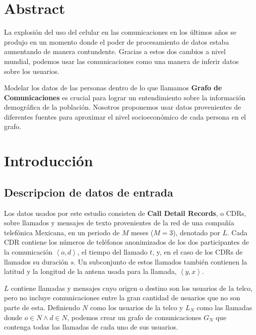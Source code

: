 \documentclass{article}
\begin{document}
\section{Abstract}

La explosi\'on del uso del celular en las comunicaciones en los \'ultimos a\~nos se produjo en un momento donde el poder de procesamiento de datos estaba aumentando de manera contundente. Gracias a estos dos cambios a nivel mundial, podemos usar las comunicaciones como una manera de inferir datos sobre los usuarios.

Modelar los datos de las personas dentro de lo que llamamos \textbf{Grafo de Comunicaciones} es crucial para lograr un entendimiento sobre la informaci\'on demogr\'afica de la poblaci\'on. Nosotros proponemos usar datos provenientes de diferentes fuentes para aproximar el nivel socioecon\'omico de cada persona en el grafo.

\section{Introducci\'on}


\subsection{Descripcion de datos de entrada}

Los datos usados por este estudio consisten de \textbf{Call Detail Records}, o CDRs, sobre llamados y mensajes de texto provenientes de la red de una compa\~n\'ia telef\'onica Mexicana, en un periodo de \( M \) meses (\( M = 3 \)), denotado por \( L \). Cada CDR contiene los n\'umeros de tel\'efonos anonimizados de los dos participantes de la comunicaci\'on \(\left<o, d\right>\), el tiempo del llamado \(t\), y, en el caso de los CDRs de llamados su duraci\'on \(s\). Un subconjunto de estos llamados tambi\'en contienen la latitud y la longitud de la antena usada para la llamada, \(\left<y, x\right>\).

\( L \) contiene llamadas y mensajes cuyo origen o destino son los usuarios de la telco, pero no incluye comunicaciones entre la gran cantidad de usuarios que no son parte de esta. Definiendo \( N \) como los usuarios de la telco y \( L_N \) como las llamadas donde \( o \in N \wedge d \in N \), podemos crear un grafo de comunicaciones \( G_N \) que contenga todas las llamadas de cada uno de sus usuarios.
\end{document}

